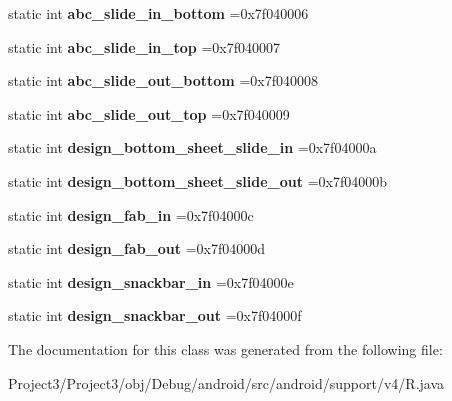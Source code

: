 \begin{DoxyCompactItemize}
static int {\bfseries abc\+\_\+slide\+\_\+in\+\_\+bottom} =0x7f040006
\item 
\mbox{\label{classandroid_1_1support_1_1v4_1_1R_1_1anim_a84e0f9e5cca256c3c82103b554eecb88}} 
static int {\bfseries abc\+\_\+slide\+\_\+in\+\_\+top} =0x7f040007
\item 
\mbox{\label{classandroid_1_1support_1_1v4_1_1R_1_1anim_a11d33e43b3a9c4e9af637643879f137a}} 
static int {\bfseries abc\+\_\+slide\+\_\+out\+\_\+bottom} =0x7f040008
\item 
\mbox{\label{classandroid_1_1support_1_1v4_1_1R_1_1anim_aa9d3f617d1c25b4d924eddfd352ccbc0}} 
static int {\bfseries abc\+\_\+slide\+\_\+out\+\_\+top} =0x7f040009
\item 
\mbox{\label{classandroid_1_1support_1_1v4_1_1R_1_1anim_a7f41cd3a4912c318bcceab108dcc090e}} 
static int {\bfseries design\+\_\+bottom\+\_\+sheet\+\_\+slide\+\_\+in} =0x7f04000a
\item 
\mbox{\label{classandroid_1_1support_1_1v4_1_1R_1_1anim_a36aa6dba0ba2cf805338977625513f25}} 
static int {\bfseries design\+\_\+bottom\+\_\+sheet\+\_\+slide\+\_\+out} =0x7f04000b
\item 
\mbox{\label{classandroid_1_1support_1_1v4_1_1R_1_1anim_ab869259e1aaa27238badddf4d1cca396}} 
static int {\bfseries design\+\_\+fab\+\_\+in} =0x7f04000c
\item 
\mbox{\label{classandroid_1_1support_1_1v4_1_1R_1_1anim_ab24f29c5d61ba3c4d5bbe79fe4e0cec3}} 
static int {\bfseries design\+\_\+fab\+\_\+out} =0x7f04000d
\item 
\mbox{\label{classandroid_1_1support_1_1v4_1_1R_1_1anim_ab4df7428fa8fd4f68a5356e871be660b}} 
static int {\bfseries design\+\_\+snackbar\+\_\+in} =0x7f04000e
\item 
\mbox{\label{classandroid_1_1support_1_1v4_1_1R_1_1anim_a3f1ec1c5a442ca4c4d24374f34220c45}} 
static int {\bfseries design\+\_\+snackbar\+\_\+out} =0x7f04000f
\end{DoxyCompactItemize}


The documentation for this class was generated from the following file\+:\begin{DoxyCompactItemize}
\item 
Project3/\+Project3/obj/\+Debug/android/src/android/support/v4/R.\+java\end{DoxyCompactItemize}
